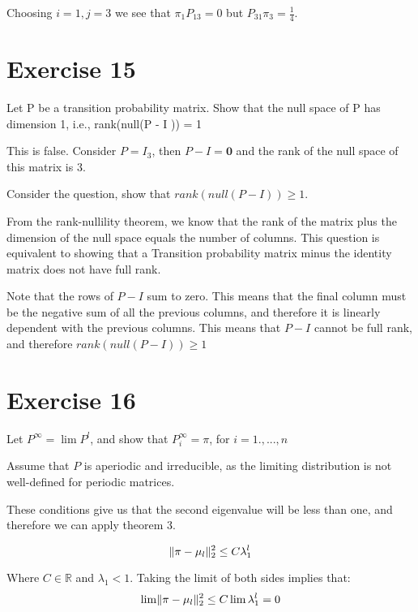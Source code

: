 \documentclass[12pt]{paper}
\newcommand{\setR}{ \mathbb{R} }
\DeclarePairedDelimiter{\norm}{\lVert}{\rVert}
\begin{document}
Choosing $i = 1, j=3$ we see that $\pi_1 P_{13} = 0$ but
$P_{31}\pi_3 = \frac{1}{4}$.


\section{Exercise 15}

Let P be a transition probability matrix. Show that the null space of P
has dimension 1, i.e., rank(null(P - I )) = 1

\vspace{.3in}

This is false. Consider $P = I_3$, then $P-I = \bm{0}$ and the rank of the
null space of this matrix is $3$.

Consider the question, show that $rank(null(P-I)) \geq 1$.

From the rank-nullility theorem, we know that the rank of the matrix
plus the dimension of the null space equals the number of
columns. This question is equivalent to showing that a Transition
probability matrix minus the identity matrix does not have full rank.

Note that the rows of $P-I$ sum to zero. This means that the final
column must be the negative sum of all the previous columns, and
therefore it is linearly dependent with the previous columns. This
means that $P-I$ cannot be full rank, and therefore $rank(null(P - I))
\geq 1$

\section{Exercise 16}

Let $P^{\infty} = \lim P^l$, and show that $P_i^{\infty} = \pi$, for
$i = 1., ..., n$

\vspace{.3in}

Assume that $P$ is aperiodic and irreducible, as the limiting
distribution is not well-defined for periodic matrices.

These conditions give us that the second eigenvalue will be less than
one, and therefore we can apply theorem 3.

\begin{equation*}
  \norm{\pi - \mu_l}_2^2 \leq C \lambda_1^l
\end{equation*}

Where $C \in \setR$ and $\lambda_1 < 1$. Taking the limit of both sides
implies that:
\begin{equation*}
  \lim \norm{\pi - \mu_l}_2^2 \leq C \lim \lambda_1^l = 0
\end{equation*}
\end{document}
